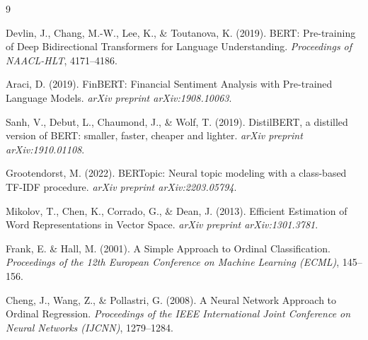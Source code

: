\documentclass[11pt,a4paper]{article}
\begin{document}
\begin{thebibliography}{9}

Devlin, J., Chang, M.-W., Lee, K., \& Toutanova, K. (2019).
BERT: Pre-training of Deep Bidirectional Transformers for Language Understanding.
\textit{Proceedings of NAACL-HLT}, 4171--4186.

Araci, D. (2019).
FinBERT: Financial Sentiment Analysis with Pre-trained Language Models.
\textit{arXiv preprint arXiv:1908.10063}.

Sanh, V., Debut, L., Chaumond, J., \& Wolf, T. (2019).
DistilBERT, a distilled version of BERT: smaller, faster, cheaper and lighter.
\textit{arXiv preprint arXiv:1910.01108}.

Grootendorst, M. (2022).
BERTopic: Neural topic modeling with a class-based TF-IDF procedure.
\textit{arXiv preprint arXiv:2203.05794}.

Mikolov, T., Chen, K., Corrado, G., \& Dean, J. (2013).
Efficient Estimation of Word Representations in Vector Space.
\textit{arXiv preprint arXiv:1301.3781}.

Frank, E. \& Hall, M. (2001).
A Simple Approach to Ordinal Classification.
\textit{Proceedings of the 12th European Conference on Machine Learning (ECML)}, 145--156.

Cheng, J., Wang, Z., \& Pollastri, G. (2008).
A Neural Network Approach to Ordinal Regression.
\textit{Proceedings of the IEEE International Joint Conference on Neural Networks (IJCNN)}, 1279--1284.

\end{thebibliography}
\end{document}
